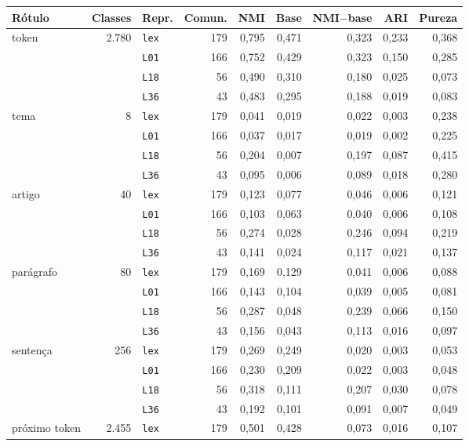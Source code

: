 \footnotesize
\setlength{\tabcolsep}{4pt}
\begin{tabular}{lrlrrrrrr}
\toprule
Rótulo & Classes & Repr. & Comun. & NMI & Base & NMI$-$base & ARI & Pureza \\
\midrule
token & 2.780 & \texttt{lex} & 179 & 0,795 & 0,471 & 0,323 & 0,233 & 0,368 \\
 &  & \texttt{L01} & 166 & 0,752 & 0,429 & 0,323 & 0,150 & 0,285 \\
 &  & \texttt{L18} & 56 & 0,490 & 0,310 & 0,180 & 0,025 & 0,073 \\
 &  & \texttt{L36} & 43 & 0,483 & 0,295 & 0,188 & 0,019 & 0,083 \\
\midrule
tema & 8 & \texttt{lex} & 179 & 0,041 & 0,019 & 0,022 & 0,003 & 0,238 \\
 &  & \texttt{L01} & 166 & 0,037 & 0,017 & 0,019 & 0,002 & 0,225 \\
 &  & \texttt{L18} & 56 & 0,204 & 0,007 & 0,197 & 0,087 & 0,415 \\
 &  & \texttt{L36} & 43 & 0,095 & 0,006 & 0,089 & 0,018 & 0,280 \\
\midrule
artigo & 40 & \texttt{lex} & 179 & 0,123 & 0,077 & 0,046 & 0,006 & 0,121 \\
 &  & \texttt{L01} & 166 & 0,103 & 0,063 & 0,040 & 0,006 & 0,108 \\
 &  & \texttt{L18} & 56 & 0,274 & 0,028 & 0,246 & 0,094 & 0,219 \\
 &  & \texttt{L36} & 43 & 0,141 & 0,024 & 0,117 & 0,021 & 0,137 \\
\midrule
parágrafo & 80 & \texttt{lex} & 179 & 0,169 & 0,129 & 0,041 & 0,006 & 0,088 \\
 &  & \texttt{L01} & 166 & 0,143 & 0,104 & 0,039 & 0,005 & 0,081 \\
 &  & \texttt{L18} & 56 & 0,287 & 0,048 & 0,239 & 0,066 & 0,150 \\
 &  & \texttt{L36} & 43 & 0,156 & 0,043 & 0,113 & 0,016 & 0,097 \\
\midrule
sentença & 256 & \texttt{lex} & 179 & 0,269 & 0,249 & 0,020 & 0,003 & 0,053 \\
 &  & \texttt{L01} & 166 & 0,230 & 0,209 & 0,022 & 0,003 & 0,048 \\
 &  & \texttt{L18} & 56 & 0,318 & 0,111 & 0,207 & 0,030 & 0,078 \\
 &  & \texttt{L36} & 43 & 0,192 & 0,101 & 0,091 & 0,007 & 0,049 \\
\midrule
próximo token & 2.455 & \texttt{lex} & 179 & 0,501 & 0,428 & 0,073 & 0,016 & 0,107 \\

\end{tabular}

